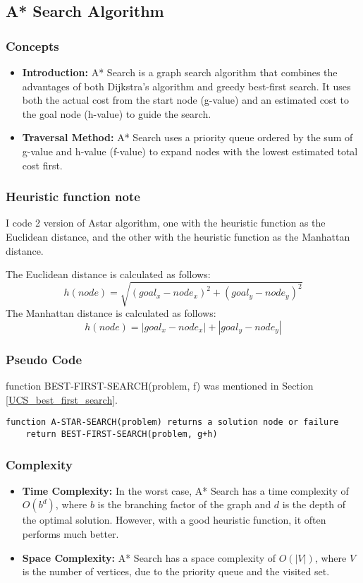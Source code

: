\subsection{A* Search Algorithm}
\subsubsection*{Concepts}
\begin{itemize}
    \item \textbf{Introduction:} A* Search is a graph search algorithm that combines the advantages of both Dijkstra's algorithm and greedy best-first search. It uses both the actual cost from the start node (g-value) and an estimated cost to the goal node (h-value) to guide the search.
    \item \textbf{Traversal Method:} A* Search uses a priority queue ordered by the sum of g-value and h-value (f-value) to expand nodes with the lowest estimated total cost first.
\end{itemize}
\subsubsection{Heuristic function note}
I code 2 version of Astar algorithm, one with the heuristic function as the Euclidean distance, and the other with the heuristic function as the Manhattan distance. 

The Euclidean distance is calculated as follows:
\[h(node) = \sqrt{(goal_x - node_x)^2 + (goal_y - node_y)^2}\]
The Manhattan distance is calculated as follows:
\[h(node) = |goal_x - node_x| + |goal_y - node_y|\]
\subsubsection*{Pseudo Code}
function BEST-FIRST-SEARCH(problem, f) was mentioned in Section \ref{UCS_best_first_search}.
\begin{verbatim}
function A-STAR-SEARCH(problem) returns a solution node or failure
    return BEST-FIRST-SEARCH(problem, g+h)
\end{verbatim}

\subsubsection*{Complexity}
\begin{itemize}
    \item \textbf{Time Complexity:} In the worst case, A* Search has a time complexity of \( O(b^d) \), where \( b \) is the branching factor of the graph and \( d \) is the depth of the optimal solution. However, with a good heuristic function, it often performs much better.
    \item \textbf{Space Complexity:} A* Search has a space complexity of \( O(|V|) \), where \( V \) is the number of vertices, due to the priority queue and the visited set.
\end{itemize}

